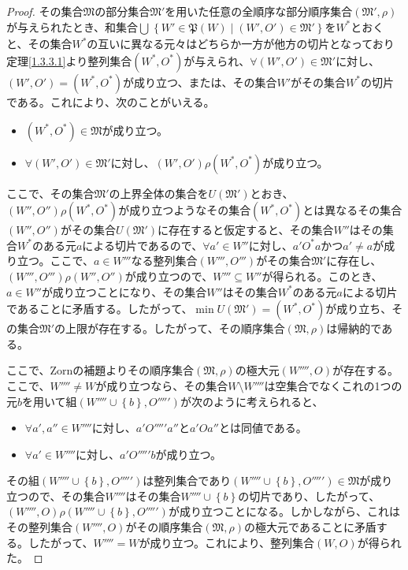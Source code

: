 \documentclass[dvipdfmx]{jsarticle}
\begin{document}
\begin{proof}
その集合$\mathfrak{M}$の部分集合$\mathfrak{M}'$を用いた任意の全順序な部分順序集合$\left( \mathfrak{M}',\rho \right)$が与えられたとき、和集合$\bigcup_{} \left\{ W'\in \mathfrak{P}(W) \middle| \left( W',O' \right) \in \mathfrak{M}' \right\}$を$W^{*}$とおくと、その集合$W^{*}$の互いに異なる元々はどちらか一方が他方の切片となっており定理\ref{1.3.3.1}より整列集合$\left( W^{*},O^{*} \right)$が与えられ、$\forall\left( W',O' \right) \in \mathfrak{M}'$に対し、$\left( W',O' \right) = \left( W^{*},O^{*} \right)$が成り立つ、または、その集合$W'$がその集合$W^{*}$の切片である。これにより、次のことがいえる。
\begin{itemize}
\item
  $\left( W^{*},O^{*} \right)\in \mathfrak{M}$が成り立つ。
\item
  $\forall\left( W',O' \right) \in \mathfrak{M}'$に対し、$\left( W',O' \right)\rho\left( W^{*},O^{*} \right)$が成り立つ。
\end{itemize}
ここで、その集合$\mathfrak{M}'$の上界全体の集合を$U\left( \mathfrak{M}' \right)$とおき、$\left( W'',O'' \right)\rho\left( W^{*},O^{*} \right)$が成り立つようなその集合$\left( W^{*},O^{*} \right)$とは異なるその集合$\left( W'',O'' \right)$がその集合$U\left( \mathfrak{M}' \right)$に存在すると仮定すると、その集合$W''$はその集合$W^{*}$のある元$a$による切片であるので、$\forall a' \in W''$に対し、$a'O^{*}a$かつ$a' \neq a$が成り立つ。ここで、$a \in W'''$なる整列集合$\left( W''',O''' \right)$がその集合$\mathfrak{M}'$に存在し、$\left( W''',O''' \right)\rho\left( W'',O'' \right)$が成り立つので、$W''' \subseteq W''$が得られる。このとき、$a \in W''$が成り立つことになり、その集合$W''$はその集合$W^{*}$のある元$a$による切片であることに矛盾する。したがって、$\min{U\left( \mathfrak{M}' \right)} = \left( W^{*},O^{*} \right)$が成り立ち、その集合$\mathfrak{M}'$の上限が存在する。したがって、その順序集合$\left( \mathfrak{M,}\rho \right)$は帰納的である。\par
ここで、Zornの補題よりその順序集合$\left( \mathfrak{M,}\rho \right)$の極大元$\left( W'''',O \right)$が存在する。ここで、$W'''' \neq W$が成り立つなら、その集合$W \setminus W''''$は空集合でなくこれの1つの元$b$を用いて組$\left( W'''' \cup \left\{ b \right\},O''''' \right)$が次のように考えられると、
\begin{itemize}
\item
  $\forall a',a'' \in W''''$に対し、$a'O'''''a''$と$a'Oa''$とは同値である。
\item
  $\forall a' \in W''''$に対し、$a'O'''''b$が成り立つ。
\end{itemize}
その組$\left( W'''' \cup \left\{ b \right\},O''''' \right)$は整列集合であり$\left( W'''' \cup \left\{ b \right\},O''''' \right)\in \mathfrak{M}$が成り立つので、その集合$W''''$はその集合$W'''' \cup \left\{ b \right\}$の切片であり、したがって、$\left( W'''',O \right)\rho\left( W'''' \cup \left\{ b \right\},O''''' \right)$が成り立つことになる。しかしながら、これはその整列集合$\left( W'''',O \right)$がその順序集合$\left( \mathfrak{M,}\rho \right)$の極大元であることに矛盾する。したがって、$W'''' = W$が成り立つ。これにより、整列集合$(W,O)$が得られた。
\end{proof}
\end{document}
